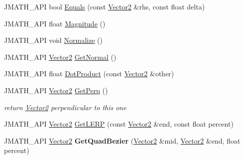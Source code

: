 \begin{DoxyCompactItemize}
\item 
J\+M\+A\+T\+H\+\_\+\+A\+P\+I bool \hyperlink{class_vector2_a24cbca12a4d7d11cf9eb3c868be397be}{Equals} (const \hyperlink{class_vector2}{Vector2} \&rhs, const float delta)
\item 
J\+M\+A\+T\+H\+\_\+\+A\+P\+I float \hyperlink{class_vector2_afd0eb6f05e1a15b3d8656d5e0e12798a}{Magnitude} ()
\item 
J\+M\+A\+T\+H\+\_\+\+A\+P\+I void \hyperlink{class_vector2_a3b597b3bfeb114dd9e157b86330e087d}{Normalize} ()
\item 
J\+M\+A\+T\+H\+\_\+\+A\+P\+I \hyperlink{class_vector2}{Vector2} \hyperlink{class_vector2_a8c8586a22bdbc6b36d18b0cb439d7f9c}{Get\+Normal} ()
\item 
J\+M\+A\+T\+H\+\_\+\+A\+P\+I float \hyperlink{class_vector2_a23b53f7905433afadbf48003c483406c}{Dot\+Product} (const \hyperlink{class_vector2}{Vector2} \&other)
\item 
\hypertarget{class_vector2_a05d9f6c31c7cb86fd42172ed034d05df}{J\+M\+A\+T\+H\+\_\+\+A\+P\+I \hyperlink{class_vector2}{Vector2} \hyperlink{class_vector2_a05d9f6c31c7cb86fd42172ed034d05df}{Get\+Perp} ()}\label{class_vector2_a05d9f6c31c7cb86fd42172ed034d05df}

\begin{DoxyCompactList}\small\item\em return \hyperlink{class_vector2}{Vector2} perpendicular to this one \end{DoxyCompactList}\item 
J\+M\+A\+T\+H\+\_\+\+A\+P\+I \hyperlink{class_vector2}{Vector2} \hyperlink{class_vector2_a62cd7064606c0e44ad90b943557d636d}{Get\+L\+E\+R\+P} (const \hyperlink{class_vector2}{Vector2} \&end, const float percent)
\item 
\hypertarget{class_vector2_a00cef19c234e86d6c21373337faa6234}{J\+M\+A\+T\+H\+\_\+\+A\+P\+I \hyperlink{class_vector2}{Vector2} {\bfseries Get\+Quad\+Bezier} (\hyperlink{class_vector2}{Vector2} \&mid, \hyperlink{class_vector2}{Vector2} \&end, float percent)}\label{class_vector2_a00cef19c234e86d6c21373337faa6234}

\end{DoxyCompactItemize}
